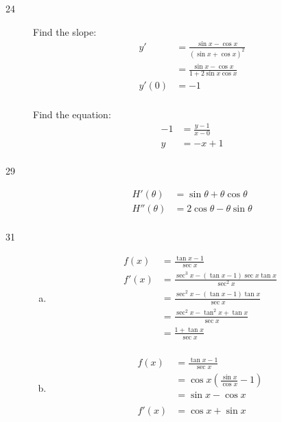 \documentclass[letterpaper, landscape]{exam}
\begin{document}
\begin{description}
    \item[24] 
      Find the slope:
      \begin{align*}
        y'    & = \frac{\sin x - \cos x}{(\sin x + \cos x)^2} \\
              & = \frac{\sin x - \cos x}{1 + 2 \sin x \cos x} \\
        y'(0) & = -1 \\
      \end{align*}

      Find the equation:
      \begin{align*}
        -1 & = \frac{y - 1}{x - 0} \\
        y  & = -x + 1 \\
      \end{align*}

    \item[29] 
      \begin{align*}
        H'(\theta)  & = \boxed{ \sin \theta + \theta \cos \theta } \\
        H''(\theta) & = \boxed{ 2 \cos \theta - \theta \sin \theta } \\
      \end{align*}

    \item[31] 
      \begin{enumerate}[(a)]
        \item 
          \begin{align*}
            f(x)  & = \frac{\tan x - 1}{\sec x} \\
            f'(x) & = \frac{\sec^3 x - (\tan x - 1) \sec x \tan x}{\sec^2 x} \\
                  & = \frac{\sec^2 x - (\tan x - 1) \tan x}{\sec x} \\
                  & = \frac{\sec^2 x - \tan^2 x + \tan x}{\sec x} \\
                  & = \frac{1 + \tan x}{\sec x} \\
          \end{align*}

        \item
          \begin{align*}
            f(x)  & = \frac{\tan x - 1}{\sec x} \\
                  & = \cos x \left( \frac{\sin x}{\cos x} - 1 \right) \\
                  & = \sin x - \cos x \\
            \\
            f'(x) & = \cos x + \sin x \\
          \end{align*}


\end{enumerate}
\end{description}
\end{document}
